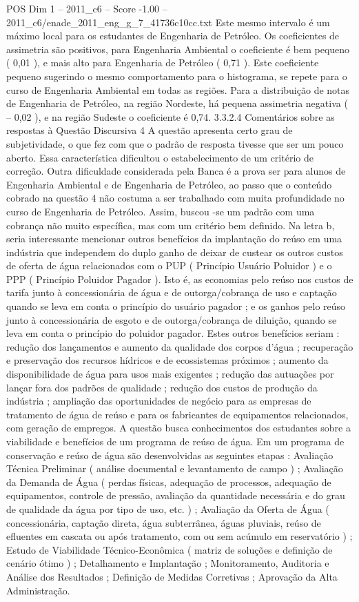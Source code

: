 \begin{textsample}{POS Dim 1 – 2011\_c6 – Score -1.00 – 2011\_c6/enade\_2011\_eng\_g\_7\_41736c10cc.txt}
Este mesmo intervalo é um máximo local para os estudantes de Engenharia de Petróleo.
Os coeficientes de assimetria são positivos, para Engenharia Ambiental o coeficiente é bem pequeno ( 0,01 ), e mais alto para Engenharia de Petróleo ( 0,71 ).
Este coeficiente pequeno sugerindo o mesmo comportamento para o histograma, se repete para o curso de Engenharia Ambiental em todas as regiões.
Para a distribuição de notas de Engenharia de Petróleo, na região Nordeste, há pequena assimetria negativa ( – 0,02 ), e na região Sudeste o coeficiente é 0,74. 3.3.2.4 Comentários sobre as respostas à Questão Discursiva 4 A questão apresenta certo grau de subjetividade, o que fez com que o padrão de resposta tivesse que ser um pouco aberto.
Essa característica dificultou o estabelecimento de um critério de correção.
Outra dificuldade considerada pela Banca é a prova ser para alunos de Engenharia Ambiental e de Engenharia de Petróleo, ao passo que o conteúdo cobrado na questão 4 não costuma a ser trabalhado com muita profundidade no curso de Engenharia de Petróleo.
Assim, buscou -se um padrão com uma cobrança não muito específica, mas com um critério bem definido.
Na letra b, seria interessante mencionar outros benefícios da implantação do reúso em uma indústria que independem do duplo ganho de deixar de custear os outros custos de oferta de água relacionados com o PUP ( Princípio Usuário Poluidor ) e o PPP ( Princípio Poluidor Pagador ).
Isto é, as economias pelo reúso nos custos de tarifa junto à concessionária de água e de outorga/cobrança de uso e captação quando se leva em conta o princípio do usuário pagador ; e os ganhos pelo reúso junto à concessionária de esgoto e de outorga/cobrança de diluição, quando se leva em conta o princípio do poluidor pagador.
Estes outros benefícios seriam : redução dos lançamentos e aumento da qualidade dos corpos d’água ; recuperação e preservação dos recursos hídricos e de ecossistemas próximos ; aumento da disponibilidade de água para usos mais exigentes ; redução das autuações por lançar fora dos padrões de qualidade ; redução dos custos de produção da indústria ; ampliação das oportunidades de negócio para as empresas de tratamento de água de reúso e para os fabricantes de equipamentos relacionados, com geração de empregos.
A questão busca conhecimentos dos estudantes sobre a viabilidade e benefícios de um programa de reúso de água.
Em um programa de conservação e reúso de água são desenvolvidas as seguintes etapas : Avaliação Técnica Preliminar ( análise documental e levantamento de campo ) ; Avaliação da Demanda de Água ( perdas físicas, adequação de processos, adequação de equipamentos, controle de pressão, avaliação da quantidade necessária e do grau de qualidade da água por tipo de uso, etc. ) ; Avaliação da Oferta de Água ( concessionária, captação direta, água subterrânea, águas pluviais, reúso de efluentes em cascata ou após tratamento, com ou sem acúmulo em reservatório ) ; Estudo de Viabilidade Técnico-Econômica ( matriz de soluções e definição de cenário ótimo ) ; Detalhamento e Implantação ; Monitoramento, Auditoria e Análise dos Resultados ; Definição de Medidas Corretivas ; Aprovação da Alta Administração.

\end{textsample}
